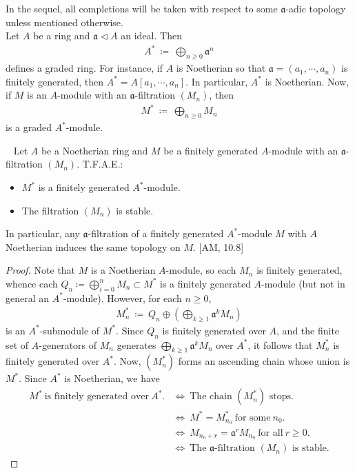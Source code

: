 \documentclass[12pt,a4paper,footinclude=true,headinclude=true]{scrbook} %
\newenvironment{lemma}[2][]
{\renewcommand\theinnercustomlemma{#2}\innercustomlemma[#1]
\begin{mdframed}[backgroundcolor=gray!20]\ }
{\end{mdframed}\endinnercustomprop}
\begin{document}
In the sequel, all completions will be taken with respect to some $\mathfrak{a}$-adic topology unless mentioned otherwise.\\
Let $A$ be a ring and $\mathfrak{a}\triangleleft A$ an ideal. Then 
\begin{align*}
    A^\ast\ \coloneqq\ \bigoplus_{n\geq0}\mathfrak{a}^n
\end{align*}
defines a graded ring. For instance, if $A$ is Noetherian so that $\mathfrak{a}=(a_1,\cdots,a_n)$ is finitely generated, then $A^\ast=A[a_1,\cdots,a_n]$. In particular, $A^\ast$ is Noetherian. Now, if $M$ is an $A$-module with an $\mathfrak{a}$-filtration $(M_n)$, then 
\begin{align*}
    M^\ast\ \coloneqq\ \bigoplus_{n\geq0}M_n
\end{align*}
is a graded $A^\ast$-module.

\begin{lemma}{290}
    Let $A$ be a Noetherian ring and $M$ be a finitely generated $A$-module with an $\mathfrak{a}$-filtration $(M_n)$. T.F.A.E.:
    \begin{itemize}
        \item[(a)] $M^\ast$ is a finitely generated $A^\ast$-module.
        \item[(b)] The filtration $(M_n)$ is stable.
    \end{itemize}
    In particular, any $\mathfrak{a}$-filtration of a finitely generated $A^\ast$-module $M$ with $A$ Noetherian induces the same topology on $M$. [AM, 10.8]
\end{lemma}
\begin{proof}
    Note that $M$ is a Noetherian $A$-module, so each $M_n$ is finitely generated, whence each $Q_n\coloneqq\bigoplus_{i=0}^nM_n\subset M^\ast$ is a finitely generated $A$-module (but not in general an $A^\ast$-module). However, for each $n\geq0$,
    \begin{align*}
        M_n^\ast\ \coloneqq\ Q_n\oplus(\bigoplus_{k\geq1}\mathfrak{a}^kM_n)
    \end{align*}
    is an $A^\ast$-submodule of $M^\ast$. Since $Q_n$ is finitely generated over $A$, and the finite set of $A$-generators of $M_n$ generates $\bigoplus_{k\geq1}\mathfrak{a}^kM_n$ over $A^\ast$, it follows that $M_n^\ast$ is finitely generated over $A^\ast$. Now, $(M_n^\ast)$ forms an ascending chain whose union is $M^\ast$. Since $A^\ast$ is Noetherian, we have
    \begin{align*}
        M^\ast\ \text{is finitely generated over}\ A^\ast. 
        &\Leftrightarrow\ \text{The chain $(M_n^\ast)$ stops}.\\
        &\Leftrightarrow\ M^\ast=M_{n_0}^\ast\ \text{for some}\ n_0.\\
        &\Leftrightarrow\ M_{n_0+r}=\mathfrak{a}^rM_{n_0}\ \text{for all}\ r\geq0.\\
        &\Leftrightarrow\ \text{The $\mathfrak{a}$-filtration $(M_n)$ is stable}.
    \end{align*}
\end{proof}
\end{document}
